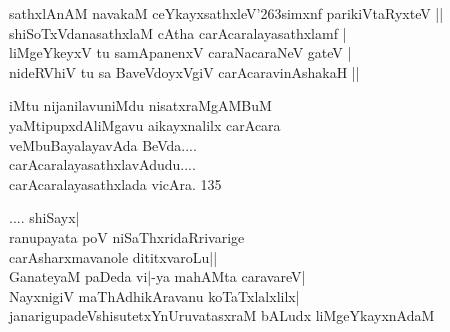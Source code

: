 \begin{entry}
\begin{shl}
sathxlAnAM navakaM ceYkayxsathxleV{\char'263}simxnf parikiVtaRyxteV ||\\
shiSoTxVdanasathxlaM cAtha carAcaralayasathxlamf |\\
liMgeYkeyxV tu samApanenxV caraNacaraNeV gateV |\\
nideRVhiV tu sa BaveVdoyxVgiV carAcaravinAshakaH ||
\end{shl}

\begin{shl}
iMtu nijanilavuniMdu nisatxraMgAMBuM\\
yaMtipupxdAliMgavu aikayxnalilx carAcara\\
veMbuBayalayavAda BeVda....\\
carAcaralayasathxlavAdudu....\\
carAcaralayasathxlada vicAra. 135 
\end{shl}
\end{entry}

\begin{entry}
\end{entry}

\begin{entry}
\begin{shl}
.... shiSayx|\\
ranupayata poV niSaThxridaRrivarige\\
carAsharxmavanole dititxvaroLu||\\
GanateyaM paDeda vi|-ya mahAMta caravareV|\\
NayxnigiV maThAdhikAravanu koTaTxlalxlilx|\\
janarigupadeVshisutetxYnUruvatasxraM bALudx liMgeYkayxnAdaM
\end{shl}
\end{entry}

